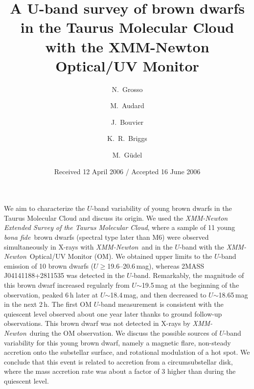 \documentclass{aa}
\newcommand{\xmm}{{\it XMM-Newton}}
\newcommand{\bona}{{\sl bona fide}}
\newcommand{\xest}{{\it XMM-Newton Extended Survey of the Taurus
Molecular Cloud}}
\begin{document}
%
   \title{A U-band survey of brown dwarfs in the Taurus Molecular
Cloud with the XMM-Newton Optical/UV Monitor}




   \author{N.\ Grosso
\and M.\ Audard
\and J.\ Bouvier
\and K.~R.\ Briggs
\and M.\ G{\"u}del}



   \date{Received 12 April 2006 / Accepted 16 June 2006}


  \abstract
   {}
   {We aim to characterize the $U$-band variability of young
brown dwarfs in the Taurus Molecular Cloud and discuss its origin.}
   {We used the \xest, where a sample of 11
     young \bona~brown dwarfs (spectral type later than M6)
     were observed simultaneously in X-rays with \xmm~and in the
     $U$-band with the \xmm~Optical/UV Monitor (OM).}
   {We obtained upper limits to the $U$-band emission of 10 brown dwarfs
($U$$\ge$19.6--20.6\,mag), whereas 2MASS\,J04141188+2811535 was
detected in the $U$-band. Remarkably, the magnitude of this brown
dwarf increased regularly from $U$$\sim$19.5\,mag at the beginning of
the observation, peaked 6\,h later at
$U$$\sim$18.4\,mag, and then decreased to
$U$$\sim$18.65\,mag in the next 2\,h. The first OM $U$-band
measurement is consistent with the quiescent level observed about one
year later thanks to ground follow-up observations. This brown dwarf was not
detected in X-rays by \xmm~during the OM observation.}
   {We discuss the possible sources of $U$-band variability for
this young brown dwarf, namely a magnetic flare, non-steady accretion onto
the substellar surface, and rotational modulation of a hot spot. 
We conclude that this event is related to accretion from
a circumsubstellar disk, where the mass accretion rate was about
a factor of 3 higher than during the quiescent level.}
\end{document}
